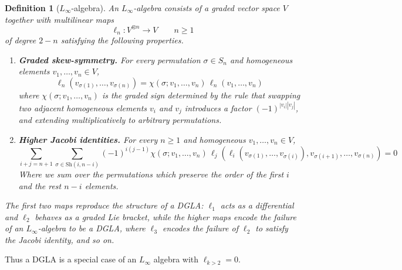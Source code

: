 \documentclass[
  12pt,
  a4paper, oneside
]{report}
\theoremstyle{bolddef}
\newtheorem{definition}{Definition}
\theoremstyle{remark}
\numberwithin{equation}{chapter}
\begin{document}
\begin{definition}[$L_{\infty}$-algebra]
An $L_\infty$-algebra consists of a graded vector space $V$
together with multilinear maps
$$
\ell_n : V^{\otimes n} \to V
\qquad n \ge 1
$$
of degree $2-n$ satisfying the following properties.
\begin{enumerate}

\item \textbf{Graded skew-symmetry.}  
For every permutation $\sigma \in S_n$ and homogeneous elements
$v_1,\dots,v_n \in V$,
$$
\ell_n(v_{\sigma(1)},\dots,v_{\sigma(n)})
=
\chi(\sigma;v_1,\dots,v_n)\,
\ell_n(v_1,\dots,v_n)
$$
where $\chi(\sigma;v_1,\dots,v_n)$ is the graded sign determined by the rule that swapping two adjacent homogeneous elements $v_i$ and $v_j$ introduces a factor $(-1)^{|v_i||v_j|}$, and extending multiplicatively to arbitrary permutations.

\item \textbf{Higher Jacobi identities.}  
For every $n \ge 1$ and homogeneous $v_1,\dots,v_n \in V$,
\begin{equation}
\sum_{i+j=n+1}
\sum_{\sigma\in \mathrm{Sh}(i,n-i)}
(-1)^{i(j-1)}
\chi(\sigma;v_1,\dots,v_n)\,
\ell_j\!\left(
\ell_i(v_{\sigma(1)},\dots,v_{\sigma(i)}),
v_{\sigma(i+1)},\dots,v_{\sigma(n)}
\right)
=0 
\end{equation}
Where we sum over the permutations which preserve the order of the first $i$ and the rest $n-i$ elements.
\end{enumerate}
The first two maps reproduce the structure of a DGLA: $\ell_1$ acts as a differential 
and $\ell_2$ behaves as a graded Lie bracket, while the higher maps encode the failure of an $L_{\infty}$-algebra to be a DGLA, where $\ell_{3}$ encodes the failure of $\ell_{2}$ to satisfy the Jacobi identity, and so on.
\end{definition}

Thus a DGLA is a special case of an $L_{\infty}$ algebra with $\ell_{k>2} = 0$. 
\end{document}
